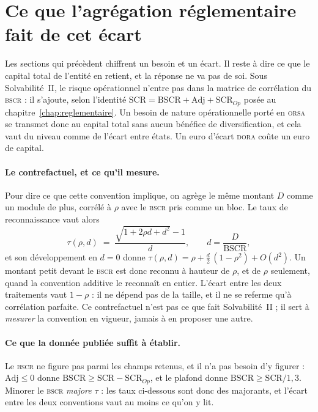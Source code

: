 \section{Ce que l'agrégation réglementaire fait de cet écart}
\label{sec:agregation-scr}

Les sections qui précèdent chiffrent un besoin et un écart. Il reste à dire ce que le capital
total de l'entité en retient, et la réponse ne va pas de soi. Sous Solvabilité~II, le risque
opérationnel n'entre pas dans la matrice de corrélation du \textsc{bscr} : il s'ajoute,
selon l'identité $\mathrm{SCR} = \mathrm{BSCR} + \mathrm{Adj} + \mathrm{SCR}_{Op}$ posée au
chapitre~\ref{chap:reglementaire}. Un besoin de nature opérationnelle porté en \textsc{orsa} se
transmet donc au capital total sans aucun bénéfice de diversification, et cela vaut du
niveau comme de l'écart entre états. Un euro d'écart \textsc{dora} coûte un euro de capital.

\paragraph{Le contrefactuel, et ce qu'il mesure.} Pour dire ce que cette convention implique, on
agrège le même montant $D$ comme un module de plus, corrélé à $\rho$ avec le \textsc{bscr} pris
comme un bloc. Le taux de reconnaissance vaut alors
\[
  \tau(\rho, d) \;=\; \frac{\sqrt{1 + 2\rho d + d^{2}} - 1}{d},
  \qquad d = \frac{D}{\mathrm{BSCR}},
\]
et son développement en $d = 0$ donne $\tau(\rho, d) = \rho + \tfrac{d}{2}\,(1 - \rho^{2}) +
O(d^{2})$. Un montant petit devant le \textsc{bscr} est donc reconnu à hauteur de $\rho$,
et de $\rho$ seulement, quand la convention additive le reconnaît en entier. L'écart entre les
deux traitements vaut $1 - \rho$ : il ne dépend pas de la taille, et il ne se referme qu'à
corrélation parfaite. Ce contrefactuel n'est pas ce que fait Solvabilité~II ; il sert à
\emph{mesurer} la convention en vigueur, jamais à en proposer une autre.

\paragraph{Ce que la donnée publiée suffit à établir.} Le \textsc{bscr} ne figure pas parmi les
champs retenus, et il n'a pas besoin d'y figurer : $\mathrm{Adj} \le 0$ donne
$\mathrm{BSCR} \ge \mathrm{SCR} - \mathrm{SCR}_{Op}$, et le plafond donne
$\mathrm{BSCR} \ge \mathrm{SCR}/1{,}3$. Minorer le \textsc{bscr} \emph{majore} $\tau$ : les taux
ci-dessous sont donc des majorants, et l'écart entre les deux conventions vaut au moins ce qu'on
y lit.

